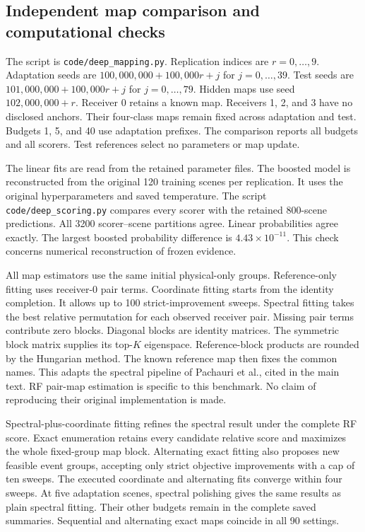 \subsection{Independent map comparison and computational checks}
The script is \texttt{code/deep\_mapping.py}. Replication indices are $r=0,\ldots,9$. Adaptation seeds are $100{,}000{,}000+100{,}000r+j$ for $j=0,\ldots,39$. Test seeds are $101{,}000{,}000+100{,}000r+j$ for $j=0,\ldots,79$. Hidden maps use seed $102{,}000{,}000+r$. Receiver 0 retains a known map. Receivers 1, 2, and 3 have no disclosed anchors. Their four-class maps remain fixed across adaptation and test. Budgets 1, 5, and 40 use adaptation prefixes. The comparison reports all budgets and all scorers. Test references select no parameters or map update.

The linear fits are read from the retained parameter files. The boosted model is reconstructed from the original 120 training scenes per replication. It uses the original hyperparameters and saved temperature. The script \texttt{code/deep\_scoring.py} compares every scorer with the retained 800-scene predictions. All 3200 scorer--scene partitions agree. Linear probabilities agree exactly. The largest boosted probability difference is $4.43\times10^{-11}$. This check concerns numerical reconstruction of frozen evidence.

All map estimators use the same initial physical-only groups. Reference-only fitting uses receiver-0 pair terms. Coordinate fitting starts from the identity completion. It allows up to 100 strict-improvement sweeps. Spectral fitting takes the best relative permutation for each observed receiver pair. Missing pair terms contribute zero blocks. Diagonal blocks are identity matrices. The symmetric block matrix supplies its top-$K$ eigenspace. Reference-block products are rounded by the Hungarian method. The known reference map then fixes the common names. This adapts the spectral pipeline of Pachauri et al., cited in the main text. RF pair-map estimation is specific to this benchmark. No claim of reproducing their original implementation is made.

Spectral-plus-coordinate fitting refines the spectral result under the complete RF score. Exact enumeration retains every candidate relative score and maximizes the whole fixed-group map block. Alternating exact fitting also proposes new feasible event groups, accepting only strict objective improvements with a cap of ten sweeps. The executed coordinate and alternating fits converge within four sweeps. At five adaptation scenes, spectral polishing gives the same results as plain spectral fitting. Their other budgets remain in the complete saved summaries. Sequential and alternating exact maps coincide in all 90 settings.

